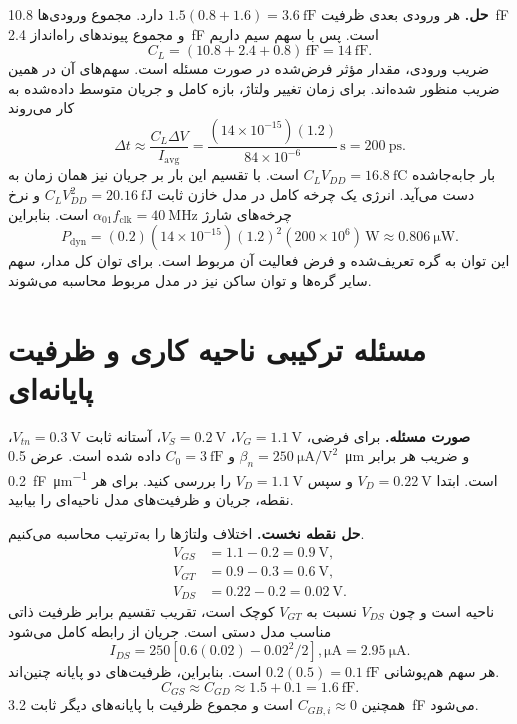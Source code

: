\textbf{حل.} هر ورودی بعدی ظرفیت
\(1.5(0.8+1.6)=\qty{3.6}{\femto\farad}\) دارد.
مجموع ورودی‌ها \qty{10.8}{\femto\farad} و مجموع پیوندهای 
راه‌انداز \qty{2.4}{\femto\farad} است. پس با سهم سیم داریم
\[
 C_L=(10.8+2.4+0.8)\,\unit{\femto\farad}=\qty{14}{\femto\farad}.
\]
ضریب ورودی، مقدار مؤثر فرض‌شده در صورت مسئله است.
سهم‌های آن در همین ضریب منظور شده‌اند.
برای زمان تغییر ولتاژ، بازه کامل و جریان متوسط داده‌شده به کار می‌روند
\[
 \Delta t\approx\frac{C_L\Delta V}{I_{\mathrm{avg}}}
 =\frac{(14\times10^{-15})(1.2)}{84\times10^{-6}}\,\unit{\second}
 =\qty{200}{\pico\second}.
\]
بار جابه‌جاشده \(C_LV_{DD}=\qty{16.8}{\femto\coulomb}\) است.
با تقسیم این بار بر جریان نیز همان زمان به دست می‌آید.
انرژی یک چرخه کامل در مدل خازن ثابت \(C_LV_{DD}^2=\qty{20.16}{\femto\joule}\)
و نرخ چرخه‌های شارژ \(\alpha_{01}f_{\mathrm{clk}}=\qty{40}{\mega\hertz}\) است.
بنابراین
\[
 P_{\mathrm{dyn}}=(0.2)(14\times10^{-15})(1.2)^2(200\times10^6)
 \,\unit{\watt}\approx\qty{0.806}{\micro\watt}.
\]
این توان به گره تعریف‌شده و فرض فعالیت آن مربوط است.
برای توان کل مدار، سهم سایر گره‌ها و توان ساکن نیز در مدل مربوط محاسبه می‌شوند.
\clearpage

\section*{مسئله ترکیبی ناحیه کاری و ظرفیت پایانه‌ای}
{}
\textbf{صورت مسئله.} برای  فرضی، \(V_G=\qty{1.1}{\volt}\)،
\(V_S=\qty{0.2}{\volt}\)، آستانه ثابت \(V_{tn}=\qty{0.3}{\volt}\)،
\(\beta_n=\qty{250}{\micro\ampere\per\volt\squared}\) و
\(C_0=\qty{3}{\femto\farad}\) داده شده است.
عرض \qty{0.5}{\micro\metre} و ضریب هر  برابر
\qty{0.2}{\femto\farad\per\micro\metre} است.
ابتدا \(V_D=\qty{0.22}{\volt}\) و سپس \(V_D=\qty{1.1}{\volt}\) را بررسی کنید.
برای هر نقطه، جریان و ظرفیت‌های مدل ناحیه‌ای را بیابید.

\textbf{حل نقطه نخست.} اختلاف ولتاژها را به‌ترتیب محاسبه می‌کنیم.
\[
 \begin{aligned}
 V_{GS}&=1.1-0.2=\qty{0.9}{\volt},\\
 V_{GT}&=0.9-0.3=\qty{0.6}{\volt},\\
 V_{DS}&=0.22-0.2=\qty{0.02}{\volt}.
 \end{aligned}
\]
ناحیه  است و چون \(V_{DS}\) نسبت به \(V_{GT}\) کوچک است،
تقریب تقسیم برابر ظرفیت ذاتی مناسب مدل دستی است.
جریان از رابطه کامل  می‌شود
\[
 I_{DS}=250[0.6(0.02)-0.02^2/2],\unit{\micro\ampere}
 =\qty{2.95}{\micro\ampere}.
\]
هر سهم هم‌پوشانی \(0.2(0.5)=\qty{0.1}{\femto\farad}\) است.
بنابراین، ظرفیت‌های دو پایانه چنین‌اند.
\[
 C_{GS}\approx C_{GD}\approx1.5+0.1=\qty{1.6}{\femto\farad}.
\]
همچنین \(C_{GB,i}\approx0\) است و مجموع ظرفیت با پایانه‌های دیگر ثابت
\qty{3.2}{\femto\farad} می‌شود.

